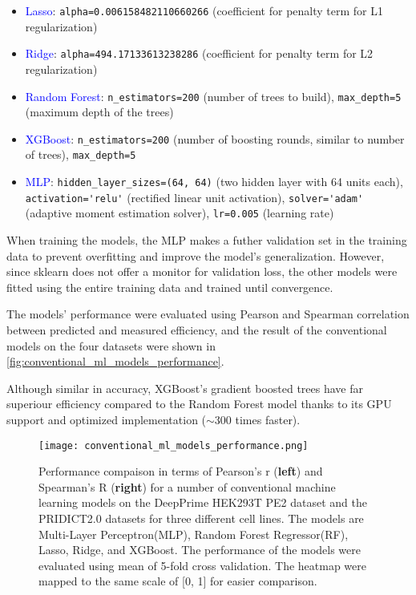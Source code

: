 \begin{itemize}[itemsep=-0mm]
    \item \textcolor{blue}{Lasso}: \verb|alpha=0.006158482110660266| (coefficient for penalty term for L1 regularization)
    \item \textcolor{blue}{Ridge}: \verb|alpha=494.17133613238286| (coefficient for penalty term for L2 regularization)
    \item \textcolor{blue}{Random Forest}: \verb|n_estimators=200| (number of trees to build), \verb|max_depth=5| (maximum depth of the trees)
    \item \textcolor{blue}{XGBoost}: \verb|n_estimators=200| (number of boosting rounds, similar to number of trees), \verb|max_depth=5| 
    \item \textcolor{blue}{MLP}: \verb|hidden_layer_sizes=(64, 64)| (two hidden layer with 64 units each), \verb|activation='relu'| (rectified linear unit activation), \verb|solver='adam'| (adaptive moment estimation solver), \verb|lr=0.005| (learning rate)
\end{itemize}

When training the models, the MLP makes a futher validation set in the training data to prevent overfitting and improve the model's generalization. However, since sklearn does not offer a monitor for validation loss, the other models were fitted using the entire training data and trained until convergence.

The models' performance were evaluated using Pearson and Spearman correlation between predicted and measured efficiency, and the result of the conventional models on the four datasets were shown in \autoref{fig:conventional_ml_models_performance}. 

Although similar in accuracy, XGBoost's gradient boosted trees have far superiour efficiency compared to the Random Forest model thanks to its GPU support and optimized implementation ($\sim$300 times faster).

\begin{figure}
    \centering
    \texttt{[image: conventional\_ml\_models\_performance.png]}
    \caption[Conventional ML model performance comparison]{Performance compaison in terms of Pearson's r (\textbf{left}) and Spearman's R (\textbf{right}) for a number of conventional machine learning models on the DeepPrime HEK293T PE2 dataset and the PRIDICT2.0 datasets for three different cell lines. The models are Multi-Layer Perceptron(MLP), Random Forest Regressor(RF), Lasso, Ridge, and XGBoost. The performance of the models were evaluated using mean of 5-fold cross validation. The heatmap were mapped to the same scale of [0, 1] for easier comparison.}
    \label{fig:conventional_ml_models_performance}
\end{figure}


